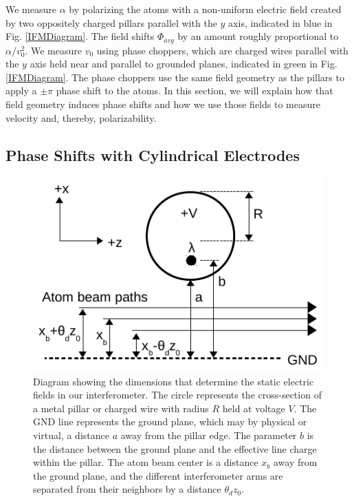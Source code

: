\documentclass[twocolumn,prl,showpacs,superscriptaddress]{revtex4-1}   %
\newcommand{\figref}[1]{Fig. \ref{#1}}
\begin{document}
We measure $\alpha$ by polarizing the atoms with a non-uniform electric field created by two oppositely charged pillars parallel with the $y$ axis, indicated in blue in \figref{IFMDiagram}. The field shifts $\Phi_{avg}$ by an amount roughly proportional to $\alpha/v_0^2$. We measure $v_0$ using phase choppers, which are charged wires parallel with the $y$ axis held near and parallel to grounded planes, indicated in green in \figref{IFMDiagram}. The phase choppers use the same field geometry as the pillars to apply a $\pm\pi$ phase shift to the atoms. In this section, we will explain how that field geometry induces phase shifts and how we use those fields to measure velocity and, thereby, polarizability. 

\subsection{Phase Shifts with Cylindrical Electrodes}
 
\begin{figure}
\includegraphics[width=\linewidth,keepaspectratio]{EDiagram1.pdf}
\caption{\label{EDiagram}Diagram showing the dimensions that determine the static electric fields in our interferometer. The circle represents the cross-section of a metal pillar or charged wire with radius $R$ held at voltage $V$. The GND line represents the ground plane, which may by physical or virtual, a distance $a$ away from the pillar edge. The parameter $b$ is the distance between the ground plane and the effective line charge within the pillar. The atom beam center is a distance $x_b$ away from the ground plane, and the different interferometer arms are separated from their neighbors by a distance $\theta_d z_0$.}
\end{figure}
\end{document}
